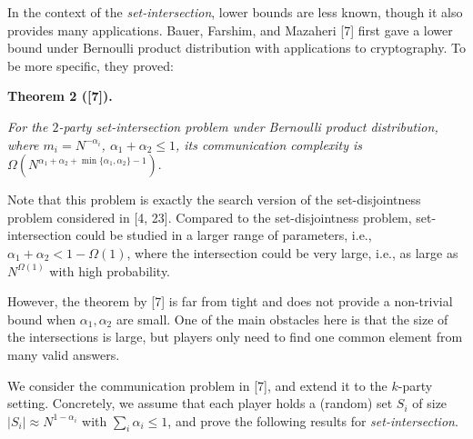 \documentclass[10pt,a4paper]{article}
\begin{document}
In the context of the \emph{set-intersection}, lower bounds are less known, though it also provides many applications. Bauer, Farshim, and Mazaheri [7] first gave a lower bound under Bernoulli product distribution with applications to cryptography. To be more specific, they proved:\par





\par\medskip\noindent\textbf{
\textbf{Theorem 2}\textbf{ }([7])\textbf{.}
}\par



\emph{For the $2$-party set-intersection problem under Bernoulli product distribution, where $m_{i}=N^{-\alpha_{i}}$, $\alpha_{1}+\alpha_{2}\leq 1$, its communication complexity is $\Omega\left(N^{\alpha_{1}+\alpha_{2}+\min\{\alpha_{1},\alpha_{2}\}-1}\right).$}\par






Note that this problem is exactly the search version of the set-disjointness problem considered in [4, 23]. Compared to the set-disjointness problem, set-intersection could be studied in a larger range of parameters, i.e., $\alpha_{1}+\alpha_{2}<1-\Omega(1)$, where the intersection could be very large, i.e., as large as $N^{\Omega(1)}$ with high probability.\par




However, the theorem by [7] is far from tight and does not provide a non-trivial bound when $\alpha_{1},\alpha_{2}$ are small. One of the main obstacles here is that the size of the intersections is large, but players only need to find one common element from many valid answers.\par




We consider the communication problem in [7], and extend it to the $k$-party setting. Concretely, we assume that each player holds a (random) set $S_{i}$ of size $|S_{i}|\approx N^{1-\alpha_{i}}$ with $\sum_{i}\alpha_{i}\leq 1$, and prove the following results for \emph{set-intersection}.\par




\end{document}
